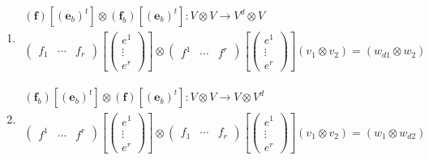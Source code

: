 \documentclass[aps,preprint]{revtex4}
\begin{document}
\begin{enumerate}
\begin{enumerate}
\item 
\begin{gather}
\left( \boldsymbol{f}\right) \left[ \left( \mathbf{e}_{b}\right) ^{t}\right]
\otimes \left( \boldsymbol{f}_{b}\right) \left[ \left( \mathbf{e}_{b}\right)
^{t}\right] :V\otimes V\rightarrow V^{d}\otimes V \\
\left( 
\begin{array}{ccc}
f_{1} & \cdots & f_{r}%
\end{array}%
\right) \left[ \left( 
\begin{array}{c}
e^{1} \\ 
\vdots \\ 
e^{r}%
\end{array}%
\right) \right] \otimes \left( 
\begin{array}{ccc}
f^{1} & \cdots & f^{r}%
\end{array}%
\right) \left[ \left( 
\begin{array}{c}
e^{1} \\ 
\vdots \\ 
e^{r}%
\end{array}%
\right) \right] \left( v_{1}\otimes v_{2}\right) =\left( w_{d1}\otimes
w_{2}\right)
\end{gather}

\item 
\begin{gather}
\left( \boldsymbol{f}_{b}\right) \left[ \left( \mathbf{e}_{b}\right) ^{t}%
\right] \otimes \left( \boldsymbol{f}\right) \left[ \left( \mathbf{e}%
_{b}\right) ^{t}\right] :V\otimes V\rightarrow V\otimes V^{d} \\
\left( 
\begin{array}{ccc}
f^{1} & \cdots & f^{r}%
\end{array}%
\right) \left[ \left( 
\begin{array}{c}
e^{1} \\ 
\vdots \\ 
e^{r}%
\end{array}%
\right) \right] \otimes \left( 
\begin{array}{ccc}
f_{1} & \cdots & f_{r}%
\end{array}%
\right) \left[ \left( 
\begin{array}{c}
e^{1} \\ 
\vdots \\ 
e^{r}%
\end{array}%
\right) \right] \left( v_{1}\otimes v_{2}\right) =\left( w_{1}\otimes
w_{d2}\right)
\end{gather}


\end{enumerate}
\end{enumerate}
\end{document}
